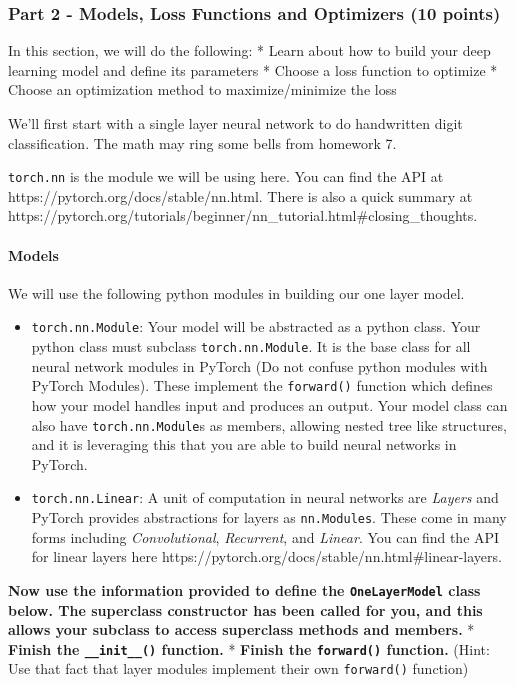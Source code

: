 \documentclass[11pt]{article}
\begin{document}
    \subsubsection{Part 2 - Models, Loss Functions and Optimizers (10
points)}\label{part-2---models-loss-functions-and-optimizers-10-points}

In this section, we will do the following: * Learn about how to build
your deep learning model and define its parameters * Choose a loss
function to optimize * Choose an optimization method to
maximize/minimize the loss

We'll first start with a single layer neural network to do handwritten
digit classification. The math may ring some bells from homework 7.

\texttt{torch.nn} is the module we will be using here. You can find the
API at https://pytorch.org/docs/stable/nn.html. There is also a quick
summary at
https://pytorch.org/tutorials/beginner/nn\_tutorial.html\#closing\_thoughts.

\paragraph{Models}\label{models}

We will use the following python modules in building our one layer
model.

\begin{itemize}
\item
  \texttt{torch.nn.Module}: Your model will be abstracted as a python
  class. Your python class must subclass \texttt{torch.nn.Module}. It is
  the base class for all neural network modules in PyTorch (Do not
  confuse python modules with PyTorch Modules). These implement the
  \texttt{forward()} function which defines how your model handles input
  and produces an output. Your model class can also have
  \texttt{torch.nn.Module}s as members, allowing nested tree like
  structures, and it is leveraging this that you are able to build
  neural networks in PyTorch.
\item
  \texttt{torch.nn.Linear}: A unit of computation in neural networks are
  \emph{Layers} and PyTorch provides abstractions for layers as
  \texttt{nn.Modules}. These come in many forms including
  \emph{Convolutional}, \emph{Recurrent}, and \emph{Linear}. You can
  find the API for linear layers here
  https://pytorch.org/docs/stable/nn.html\#linear-layers.
\end{itemize}

\textbf{Now use the information provided to define the
\texttt{OneLayerModel} class below. The superclass constructor has been
called for you, and this allows your subclass to access superclass
methods and members.} * \textbf{Finish the \texttt{\_\_init\_\_()}
function.} * \textbf{Finish the \texttt{forward()} function.} (Hint: Use
that fact that layer modules implement their own \texttt{forward()}
function)
\end{document}
